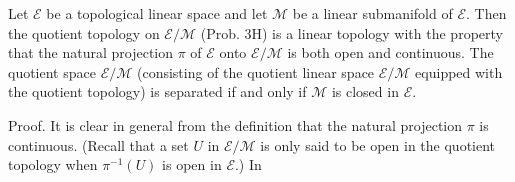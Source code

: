 Let $\mathcal{E}$ be a topological linear space and let $\mathcal{M}$ be a linear submanifold of $\mathcal{E}$. Then the quotient topology on $\mathcal{E} / \mathcal{M}$ (Prob. 3H) is a linear topology with the property that the natural projection $\pi$ of $\mathcal{E}$ onto $\mathcal{E} / \mathcal{M}$ is both open and continuous. The quotient space $\mathcal{E} / \mathcal{M}$ (consisting of the quotient linear space $\mathcal{E} / \mathcal{M}$ equipped with the quotient topology) is separated if and only if $\mathcal{M}$ is closed in $\mathcal{E}$.

Proof. It is clear in general from the definition that the natural projection $\pi$ is continuous. (Recall that a set $U$ in $\mathcal{E} / \mathcal{M}$ is only said to be open in the quotient topology when $\pi^{-1}(U)$ is open in $\mathcal{E}$.) In
